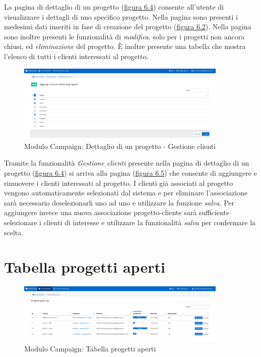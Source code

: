 \noindent La pagina di dettaglio di un progetto ({\hyperref[fig:dettaglioProgetto]{figura 6.4}}) consente all'utente di visualizzare i dettagli di uno specifico progetto. Nella pagina sono presenti i medesimi dati inseriti in fase di creazione del progetto ({\hyperref[fig:nuovoProgetto]{figura 6.2}}). Nella pagina sono inoltre presenti le funzionalità di \textit{modifica}, solo per i progetti non ancora chiusi, ed \textit{eliminazione} del progetto. È inoltre presente una tabella che mostra l'elenco di tutti i clienti interessati al progetto. 

\begin{figure}[!h]
\centering
\includegraphics[width=380px]{../images/UI/06-aggiungiRimuoviClienti.png}
\caption{Modulo Campaign: Dettaglio di un progetto - Gestione clienti}
\label{fig:gestioneClienti}
\end{figure}

\noindent Tramite la funzionalità \textit{Gestione clienti} presente nella pagina di dettaglio di un progetto ({\hyperref[fig:dettaglioProgetto]{figura 6.4}}) si arriva alla pagina ({\hyperref[fig:gestioneClienti]{figura 6.5}}) che consente di aggiungere e rimuovere i clienti interessati al progetto. I clienti già associati al progetto vengono automaticamente selezionati dal sistema e per eliminare l'associazione sarà necessario deselezionarli uno ad uno e utilizzare la funzione \textit{salva}. Per aggiungere invece una nuova associazione progetto-cliente sarà sufficiente selezionare i clienti di interesse e utilizzare la funzionalità \textit{salva} per confermare la scelta.

\pagebreak

\section{Tabella progetti aperti}
\begin{figure}[!h]
\centering
\includegraphics[width=380px]{../images/UI/07-tabellaProgettiAperti.png}
\caption{Modulo Campaign: Tabella progetti aperti}
\label{fig:tabellaProgettiAperti}
\end{figure}

